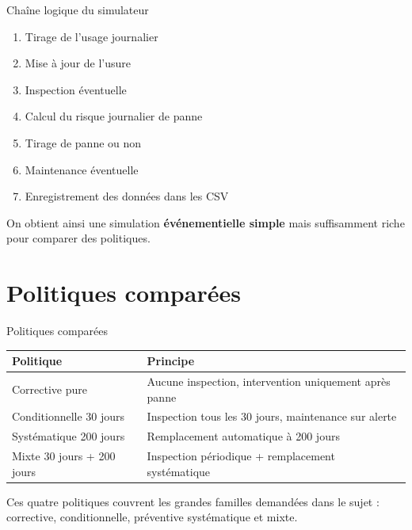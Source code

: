 \documentclass[aspectratio=169]{beamer}
\begin{document}
\begin{frame}{Chaîne logique du simulateur}
\begin{enumerate}
  \item Tirage de l'usage journalier
  \item Mise à jour de l'usure
  \item Inspection éventuelle
  \item Calcul du risque journalier de panne
  \item Tirage de panne ou non
  \item Maintenance éventuelle
  \item Enregistrement des données dans les CSV
\end{enumerate}

\vspace{0.25cm}
On obtient ainsi une simulation \textbf{événementielle simple} mais suffisamment riche pour comparer des politiques.
\end{frame}

\section{Politiques comparées}

\begin{frame}{Politiques comparées}
\centering
\begin{tabular}{>{\raggedright\arraybackslash}p{} >{\raggedright\arraybackslash}p{}}
\toprule
\textbf{Politique} & \textbf{Principe} \\
\midrule
Corrective pure & Aucune inspection, intervention uniquement après panne \\
Conditionnelle 30 jours & Inspection tous les 30 jours, maintenance sur alerte \\
Systématique 200 jours & Remplacement automatique à 200 jours \\
Mixte 30 jours + 200 jours & Inspection périodique + remplacement systématique \\
\bottomrule
\end{tabular}

\vspace{0.4cm}
Ces quatre politiques couvrent les grandes familles demandées dans le sujet : corrective, conditionnelle, préventive systématique et mixte.
\end{frame}
\end{document}
